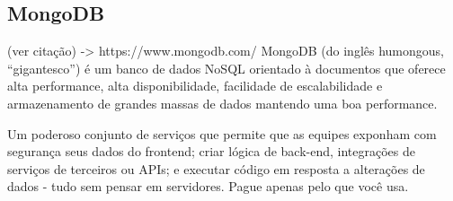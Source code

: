 \subsection{MongoDB}

(ver citação) -> https://www.mongodb.com/
MongoDB (do inglês humongous, “gigantesco”) é um banco de dados NoSQL
orientado à documentos que oferece alta performance, alta disponibilidade, facilidade de
escalabilidade e armazenamento de grandes massas de dados mantendo uma boa performance.

Um poderoso conjunto de serviços que permite que as equipes exponham com segurança seus dados do frontend; criar lógica de back-end, integrações de serviços de terceiros ou APIs; e executar código em resposta a alterações de dados - tudo sem pensar em servidores. Pague apenas pelo que você usa.






